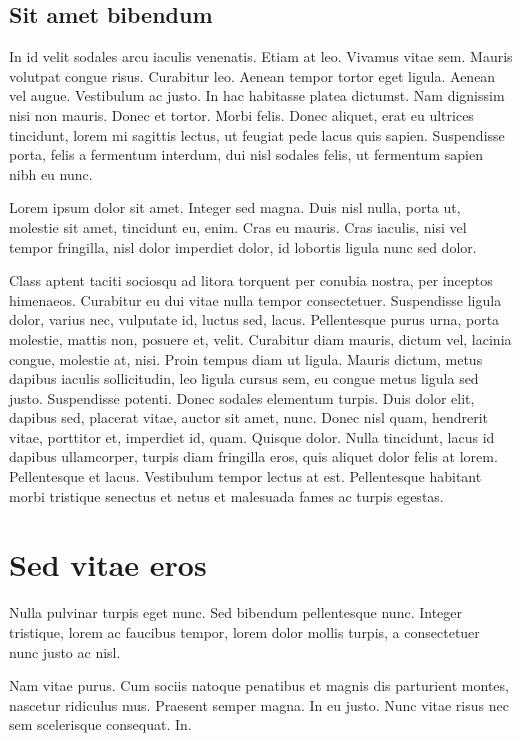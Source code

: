 \documentclass[../hdr.tex]{subfiles}
\begin{document}
\subsection{Sit amet bibendum}

In id velit sodales arcu iaculis venenatis. Etiam at leo. Vivamus vitae sem.
Mauris volutpat congue risus. Curabitur leo. Aenean tempor tortor eget ligula.
Aenean vel augue. Vestibulum ac justo. In hac habitasse platea dictumst. Nam
dignissim nisi non mauris. Donec et tortor. Morbi felis. Donec aliquet, erat eu
ultrices tincidunt, lorem mi sagittis lectus, ut feugiat pede lacus quis sapien.
Suspendisse porta, felis a fermentum interdum, dui nisl sodales felis, ut
fermentum sapien nibh eu nunc.

Lorem ipsum dolor sit amet. Integer sed magna. Duis nisl nulla, porta ut,
molestie sit amet, tincidunt eu, enim. Cras eu mauris. Cras iaculis, nisi vel
tempor fringilla, nisl dolor imperdiet dolor, id lobortis ligula nunc sed dolor.

Class aptent taciti sociosqu ad litora torquent per conubia nostra, per inceptos
himenaeos. Curabitur eu dui vitae nulla tempor consectetuer. Suspendisse ligula
dolor, varius nec, vulputate id, luctus sed, lacus. Pellentesque purus urna,
porta molestie, mattis non, posuere et, velit. Curabitur diam mauris, dictum
vel, lacinia congue, molestie at, nisi. Proin tempus diam ut ligula. Mauris
dictum, metus dapibus iaculis sollicitudin, leo ligula cursus sem, eu congue
metus ligula sed justo. Suspendisse potenti. Donec sodales elementum turpis.
Duis dolor elit, dapibus sed, placerat vitae, auctor sit amet, nunc. Donec nisl
quam, hendrerit vitae, porttitor et, imperdiet id, quam. Quisque dolor. Nulla
tincidunt, lacus id dapibus ullamcorper, turpis diam fringilla eros, quis
aliquet dolor felis at lorem. Pellentesque et lacus. Vestibulum tempor lectus at
est. Pellentesque habitant morbi tristique senectus et netus et malesuada fames
ac turpis egestas. 

\section{Sed vitae eros}

Nulla pulvinar turpis eget nunc. Sed bibendum
pellentesque nunc. Integer tristique, lorem ac faucibus tempor, lorem dolor
mollis turpis, a consectetuer nunc justo ac nisl.

Nam vitae purus. Cum sociis natoque penatibus et magnis dis parturient montes,
nascetur ridiculus mus. Praesent semper magna. In eu justo. Nunc vitae risus nec
sem scelerisque consequat. In.

\ifSubfilesClassLoaded{%
\printbibliography
}{%
  \vskip2cm
}
\end{document}
